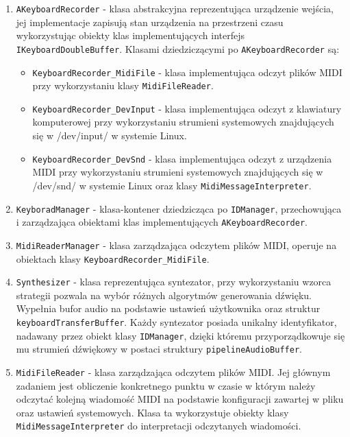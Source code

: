 \begin{enumerate}
    \item \texttt{AKeyboardRecorder} - klasa abstrakcyjna reprezentująca urządzenie wejścia, jej implementacje zapisują stan urządzenia na przestrzeni czasu wykorzystując obiekty klas implementujących interfejs \texttt{IKeyboardDoubleBuffer}. Klasami dziedziczącymi po \texttt{AKeyboardRecorder} są:
    \begin{itemize}
        \item \texttt{KeyboardRecorder\_MidiFile} - klasa implementująca odczyt plików MIDI przy wykorzystaniu klasy \texttt{MidiFileReader}.
        \item \texttt{KeyboardRecorder\_DevInput} - klasa implementująca odczyt z klawiatury komputerowej przy wykorzystaniu strumieni systemowych znajdujących się w /dev/input/\cite{bib:system-streem} w systemie Linux.
        \item \texttt{KeyboardRecorder\_DevSnd} - klasa implementująca odczyt z urządzenia MIDI przy wykorzystaniu strumieni systemowych znajdujących się w /dev/snd/\cite{bib:system-streem} w systemie Linux oraz klasy \texttt{MidiMessageInterpreter}.
    \end{itemize}
    \item \texttt{KeyboradManager} - klasa-kontener dziedzicząca po \texttt{IDManager}, przechowująca i zarządzająca obiektami klas implementujących \texttt{AKeyboardRecorder}.
    \item \texttt{MidiReaderManager} - klasa zarządzająca odczytem plików MIDI, operuje na  obiektach klasy \texttt{KeyboardRecorder\_MidiFile}.
    \item \texttt{Synthesizer} - klasa reprezentująca syntezator, przy wykorzystaniu wzorca strategii\cite{bib:DesignPatterns} pozwala na wybór różnych algorytmów generowania dźwięku. Wypełnia bufor audio na podstawie ustawień użytkownika oraz struktur \texttt{keyboardTransferBuffer}. Każdy syntezator posiada unikalny identyfikator, nadawany przez obiekt klasy \texttt{IDManager}, dzięki któremu przyporządkowuje się mu strumień dźwiękowy w postaci struktury \texttt{pipelineAudioBuffer}.
    \item \texttt{MidiFileReader} - klasa zarządzająca odczytem plików MIDI. Jej głównym zadaniem jest obliczenie konkretnego punktu w czasie w którym należy odczytać kolejną wiadomość MIDI na podstawie konfiguracji zawartej w pliku oraz ustawień systemowych. Klasa ta wykorzystuje obiekty klasy \texttt{MidiMessageInterpreter} do interpretacji odczytanych wiadomości.
\end{enumerate}

